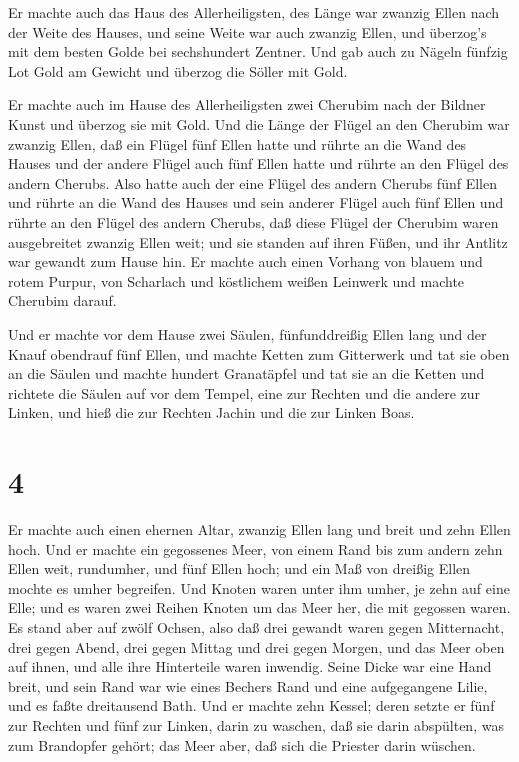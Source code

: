  Er machte auch das Haus des Allerheiligsten, des Länge war
zwanzig Ellen nach der Weite des Hauses, und seine Weite war auch
zwanzig Ellen, und überzog's mit dem besten Golde bei sechshundert
Zentner.  Und gab auch zu Nägeln fünfzig Lot Gold am Gewicht
und überzog die Söller mit Gold.

 Er machte auch im Hause des Allerheiligsten zwei Cherubim
nach der Bildner Kunst und überzog sie mit Gold.  Und die
Länge der Flügel an den Cherubim war zwanzig Ellen, daß ein Flügel fünf
Ellen hatte und rührte an die Wand des Hauses und der andere Flügel auch
fünf Ellen hatte und rührte an den Flügel des andern Cherubs.
 Also hatte auch der eine Flügel des andern Cherubs fünf
Ellen und rührte an die Wand des Hauses und sein anderer Flügel auch
fünf Ellen und rührte an den Flügel des andern Cherubs, 
daß diese Flügel der Cherubim waren ausgebreitet zwanzig Ellen weit; und
sie standen auf ihren Füßen, und ihr Antlitz war gewandt zum Hause hin.
 Er machte auch einen Vorhang von blauem und rotem Purpur,
von Scharlach und köstlichem weißen Leinwerk und machte Cherubim darauf.

 Und er machte vor dem Hause zwei Säulen, fünfunddreißig
Ellen lang und der Knauf obendrauf fünf Ellen,  und machte
Ketten zum Gitterwerk und tat sie oben an die Säulen und machte hundert
Granatäpfel und tat sie an die Ketten  und richtete die
Säulen auf vor dem Tempel, eine zur Rechten und die andere zur Linken,
und hieß die zur Rechten Jachin und die zur Linken Boas.

\hypertarget{section-3}{%
\section{4}\label{section-3}}

 Er machte auch einen ehernen Altar, zwanzig Ellen lang und
breit und zehn Ellen hoch.  Und er machte ein gegossenes
Meer, von einem Rand bis zum andern zehn Ellen weit, rundumher, und fünf
Ellen hoch; und ein Maß von dreißig Ellen mochte es umher begreifen.
 Und Knoten waren unter ihm umher, je zehn auf eine Elle;
und es waren zwei Reihen Knoten um das Meer her, die mit gegossen waren.
 Es stand aber auf zwölf Ochsen, also daß drei gewandt waren
gegen Mitternacht, drei gegen Abend, drei gegen Mittag und drei gegen
Morgen, und das Meer oben auf ihnen, und alle ihre Hinterteile waren
inwendig.  Seine Dicke war eine Hand breit, und sein Rand
war wie eines Bechers Rand und eine aufgegangene Lilie, und es faßte
dreitausend Bath.  Und er machte zehn Kessel; deren setzte
er fünf zur Rechten und fünf zur Linken, darin zu waschen, daß sie darin
abspülten, was zum Brandopfer gehört; das Meer aber, daß sich die
Priester darin wüschen.

